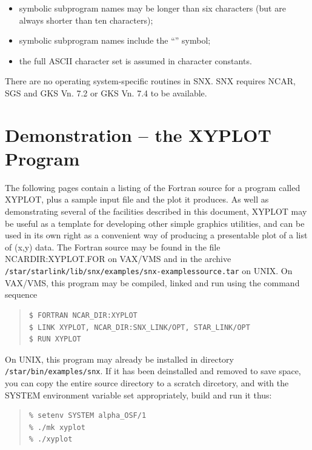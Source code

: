 \documentclass[twoside,11pt]{article}
\renewcommand{\_}{\texttt{\symbol{95}}}
\begin{document}
\begin {itemize}
\item symbolic subprogram names may be longer than six characters (but are
always shorter than ten characters);
\item symbolic subprogram names include the ``\_'' symbol;
\item the full ASCII character set is assumed in character constants.
\end {itemize}

There are no operating system-specific routines in SNX.
SNX requires NCAR, SGS and GKS Vn. 7.2 or GKS Vn. 7.4 to be available.


\section {Demonstration -- the XYPLOT Program} \label{demo1_sect}

The following pages contain a listing of the Fortran source for a
program called XYPLOT, plus a sample input file and the plot it
produces.  As well as demonstrating several of the facilities described
in this document, XYPLOT may be useful as a template for developing
other simple graphics utilities, and can be used in its own right as a
convenient way of producing a presentable plot of a list of (x,y)
data.  The Fortran source may be found in the file NCAR\_DIR:XYPLOT.FOR
on VAX/VMS and in the archive {\tt
/star/\-starlink/\-lib/\-snx/\-examples/\-snx-examples\_source.tar} on
UNIX.  On VAX/VMS, this program may be compiled, linked and run using
the command sequence

\begin {quote}
\begin{verbatim}
$ FORTRAN NCAR_DIR:XYPLOT
$ LINK XYPLOT, NCAR_DIR:SNX_LINK/OPT, STAR_LINK/OPT
$ RUN XYPLOT
\end{verbatim}
\end {quote}

On UNIX, this program may already be installed in directory
{\tt /star/bin/examples/snx}.  If it has been deinstalled and removed to save
space, you can copy the entire source directory to a scratch dircetory, and
with the SYSTEM environment variable set appropriately, build and run it thus:

\begin {quote}
\begin{verbatim}
% setenv SYSTEM alpha_OSF/1
% ./mk xyplot
% ./xyplot
\end{verbatim}
\end {quote}
\end{document}
